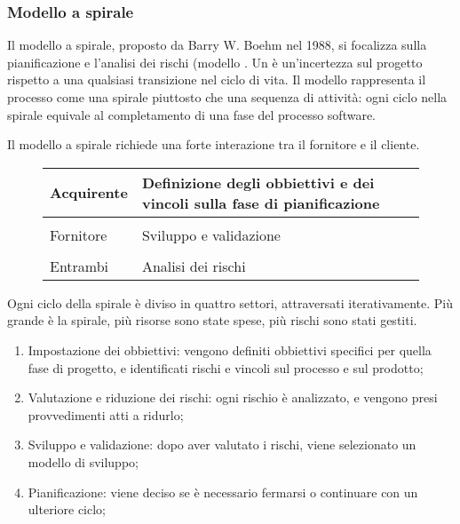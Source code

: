 \subsubsection{Modello a spirale}
Il modello a spirale, proposto da Barry W. Boehm nel 1988, si focalizza sulla pianificazione e l'analisi dei rischi (modello . Un  è un'incertezza sul progetto rispetto a una qualsiasi transizione nel ciclo di vita. Il modello rappresenta il processo come una spirale piuttosto che una sequenza di attività: ogni ciclo nella spirale equivale al completamento di una fase del processo software.

Il modello a spirale richiede una forte interazione tra il fornitore e il cliente.
\begin{figure}[h!]
	\centering
	\begin{tabular}{|l|l|}
		\hline	
		Acquirente & Definizione degli obbiettivi e dei vincoli sulla fase di pianificazione \\
		\hline \\
		Fornitore & Sviluppo e validazione \\
		\hline \\
		Entrambi & Analisi dei rischi \\
		\hline
	\end{tabular}
\end{figure}

Ogni ciclo della spirale è diviso in quattro settori, attraversati iterativamente. Più grande è la spirale, più risorse sono state spese, più rischi sono stati gestiti.
\begin{enumerate}
	\item Impostazione dei obbiettivi: vengono definiti obbiettivi specifici per quella fase di progetto, e identificati rischi e vincoli sul processo e sul prodotto;
	\item Valutazione e riduzione dei rischi: ogni rischio è analizzato, e vengono presi provvedimenti atti a ridurlo;
	\item Sviluppo e validazione: dopo aver valutato i rischi, viene selezionato un modello di sviluppo;
	\item Pianificazione: viene deciso se è necessario fermarsi o continuare con un ulteriore ciclo;
\end{enumerate}

